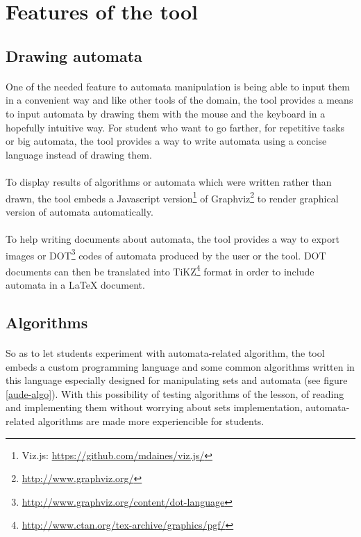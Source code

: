 \section{Features of the tool}
\subsection{Drawing automata}


\paragraph{}
One of the needed feature to automata manipulation is being able to input them in a convenient way and like other tools of the domain, the tool provides a means to input automata by drawing them with the mouse and the keyboard in a hopefully intuitive way. For student who want to go farther, for repetitive tasks or big automata, the tool provides a way to write automata using a concise language instead of drawing them.


\paragraph{}
To display results of algorithms or automata which were written rather than drawn, the tool embeds a Javascript version\footnote{Viz.js: \href{https://github.com/mdaines/viz.js/}{https://github.com/mdaines/viz.js/}} of Graphviz\footnote{\href{http://www.graphviz.org/}{http://www.graphviz.org/}} to render graphical version of automata automatically.


\paragraph{}
To help writing documents about automata, the tool provides a way to export images or DOT\footnote{\href{http://www.graphviz.org/content/dot-language}{http://www.graphviz.org/content/dot-language}} codes of automata produced by the user or the tool. DOT documents can then be translated into TiKZ\footnote{\href{http://www.ctan.org/tex-archive/graphics/pgf/}{http://www.ctan.org/tex-archive/graphics/pgf/}} format in order to include automata in a LaTeX document.


\subsection{Algorithms}


\paragraph{}
So as to let students experiment with automata-related algorithm, the tool embeds a custom programming language and some common algorithms written in this language especially designed for manipulating sets and automata (see figure \ref{aude-algo}). With this possibility of testing algorithms of the lesson, of reading and implementing them without worrying about sets implementation, automata-related algorithms are made more experiencible for students.


